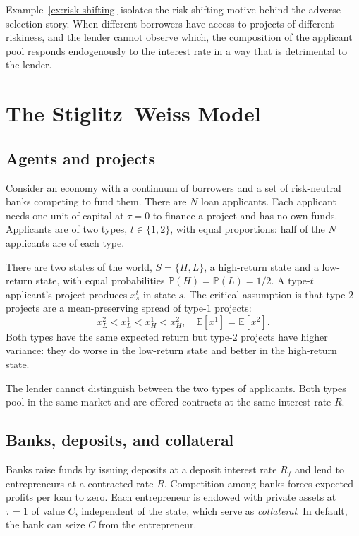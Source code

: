 \documentclass[11pt,a4paper,oneside]{book}
\def\E{\mathbb{E}}
\renewcommand{\P}{\mathbb{P}}
\theoremstyle{plain}
\theoremstyle{definition}
\theoremstyle{remark}
\numberwithin{equation}{chapter}
\begin{document}
Example~\ref{ex:risk-shifting} isolates the risk-shifting motive behind the adverse-selection story.
When different borrowers have access to projects of different riskiness, and the lender cannot observe which, the composition of the applicant pool responds endogenously to the interest rate in a way that is detrimental to the lender.

\section{The Stiglitz--Weiss Model}
\label{sec:SW-model}

\subsection{Agents and projects}

Consider an economy with a continuum of borrowers and a set of risk-neutral banks competing to fund them.
There are $N$ loan applicants.
Each applicant needs one unit of capital at $\tau = 0$ to finance a project and has no own funds.
Applicants are of two types, $t \in \{1, 2\}$, with equal proportions: half of the $N$ applicants are of each type.

There are two states of the world, $S = \{H, L\}$, a high-return state and a low-return state, with equal probabilities $\P(H) = \P(L) = 1/2$.
A type-$t$ applicant's project produces $x^t_s$ in state $s$.
The critical assumption is that type-$2$ projects are a mean-preserving spread of type-$1$ projects:
\begin{equation}\label{eq:MPS}
  x^2_L < x^1_L < x^1_H < x^2_H,
  \quad
  \E[x^1] = \E[x^2].
\end{equation}
Both types have the same expected return but type-$2$ projects have higher variance: they do worse in the low-return state and better in the high-return state.

The lender cannot distinguish between the two types of applicants.
Both types pool in the same market and are offered contracts at the same interest rate $R$.

\subsection{Banks, deposits, and collateral}

Banks raise funds by issuing deposits at a deposit interest rate $R_f$ and lend to entrepreneurs at a contracted rate $R$.
Competition among banks forces expected profits per loan to zero.
Each entrepreneur is endowed with private assets at $\tau = 1$ of value $C$, independent of the state, which serve as \emph{collateral}.
In default, the bank can seize $C$ from the entrepreneur.
\end{document}
